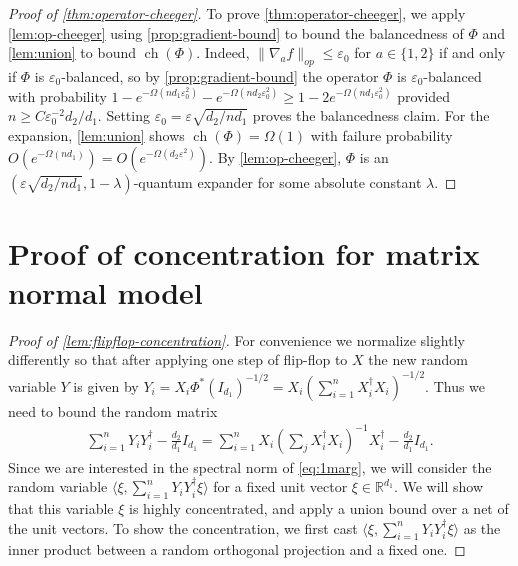 \documentclass[aos]{imsart}
\theoremstyle{definition}
\numberwithin{equation}{section}
\DeclareMathOperator{\ch}{ch}
\newcommand{\R}{{\mathbb{R}}}
\newcommand{\eps}{\varepsilon}
\begin{document}
\begin{appendix}
\begin{proof}[Proof of \cref{thm:operator-cheeger}]
To prove \cref{thm:operator-cheeger}, we apply \cref{lem:op-cheeger} using \cref{prop:gradient-bound} to bound the balancedness of $\Phi$ and \cref{lem:union} to bound $\ch(\Phi)$. Indeed, $\|\nabla_a f\|_{op} \leq \eps_0$ for $a \in \{1,2\}$ if and only if $\Phi$ is $\eps_0$-balanced, so by \cref{prop:gradient-bound} the operator $\Phi$ is $\eps_0$-balanced with probability $1 -  e^{-\Omega(n d_1 \eps_0^2)} - e^{-\Omega(n d_2 \eps_0^2)} \geq 1 - 2e^{-\Omega(n d_1 \eps_0^2)}$ provided $n \geq C\eps_0^{-2} d_2/d_1 $. Setting $\eps_0 = \eps \sqrt{{d_2 }/{n d_1}}$ proves the balancedness claim. For the expansion, \cref{lem:union} shows $\ch(\Phi) = \Omega(1)$ with failure probability $O(e^{- \Omega(n d_1)}) = O(e^{- \Omega(d_2 \eps^2)})$. By \cref{lem:op-cheeger}, $\Phi$ is an $(\eps \sqrt{{d_2 }/{n d_1}}, 1 - \lambda)$-quantum expander for some absolute constant $\lambda$.
\end{proof}



\section{Proof of concentration for matrix normal model}\label{sec:flipflop-concentration}

\begin{proof}[Proof of \cref{lem:flipflop-concentration}]
For convenience we normalize slightly differently so that after applying one step of flip-flop to $X$ the new random variable $Y$ is given by
$Y_i = X_i \Phi^*(I_{d_1})^{-1/2} =  X_i (\sum_{i = 1}^n X_i^\dagger X_i)^{-1/2}.$ Thus we need to bound the random matrix
\begin{align} \sum_{i = 1}^n Y_i Y_i^{\dagger} - \frac{d_2}{d_1} I_{d_1} = \sum_{i = 1}^n X_{i} \left( \sum_{j}  X_{i}^{\dagger} X_{i}\right)^{-1} X_{i}^\dagger - \frac{d_2}{d_1} I_{d_1}.\label{eq:1marg}
\end{align}
Since we are interested in the spectral norm of \cref{eq:1marg}, we will consider the random variable $\langle \xi,  \sum_{i = 1}^n Y_i Y_i^{\dagger} \xi \rangle$ for a fixed unit vector $\xi \in \R^{d_1}$. We will show that this variable $\xi$ is highly concentrated, and apply a union bound over a net of the unit vectors. To show the concentration, we first cast $\langle \xi,  \sum_{i = 1}^n Y_i Y_i^{\dagger} \xi \rangle$ as the inner product between a random orthogonal projection and a fixed one.


\end{proof}
\end{appendix}
\end{document}

